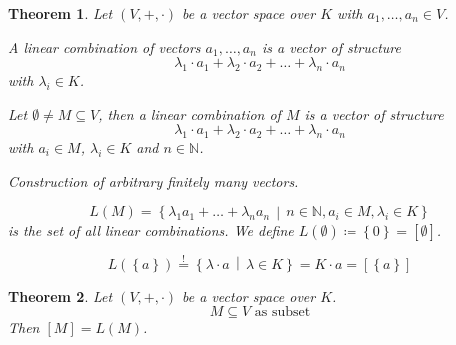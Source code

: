 \documentclass[a4paper,landscape,twocolumn]{article}
\newcommand\set[1]{\left\{#1\right\}}
\newcommand\setdef[2]{\left\{#1\,\middle|\,#2\right\}}
\newtheorem{theorem}{Theorem}
\begin{document}
\begin{theorem}
  Let $(V, +, \cdot)$ be a vector space over $K$ with $a_1, \ldots, a_n \in V$.

  A \emph{linear combination} of vectors $a_1, \ldots, a_n$ is a vector of structure
  \[ \lambda_1 \cdot a_1 + \lambda_2 \cdot a_2 + \ldots + \lambda_n \cdot a_n \]
  with $\lambda_i \in K$.

  Let $\emptyset \neq M \subseteq V$, then a linear combination of $M$ is a vector of structure
  \[ \lambda_1 \cdot a_1 + \lambda_2 \cdot a_2 + \ldots + \lambda_n \cdot a_n \]
  with $a_i \in M$, $\lambda_i \in K$ and $n \in \mathbb N$.

  Construction of arbitrary finitely many vectors.

  \[ L(M) = \setdef{\lambda_1 a_1 + \ldots + \lambda_n a_n}{n \in \mathbb N, a_i \in M, \lambda_i \in K} \]
  is the set of all linear combinations.
  We define $L(\emptyset) \coloneqq \set{0} = \left[\emptyset\right]$.

  \[ L(\set{a}) \stackrel!= \setdef{\lambda \cdot a}{\lambda \in K} = K \cdot a = \left[\set{a}\right] \]
\end{theorem}

\begin{theorem}
  \label{satz-3-12}
  Let $(V, +, \cdot)$ be a vector space over $K$.
  \[ M \subseteq V \text{ as subset} \]
  Then $[M] = L(M)$.
\end{theorem}
\end{document}
